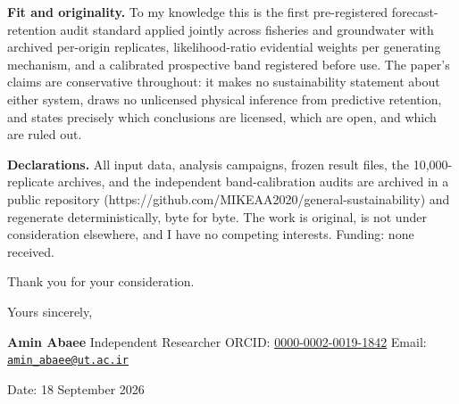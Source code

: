 \documentclass[11pt]{article}
\begin{document}
\textbf{Fit and originality.} To my knowledge this is the first
pre-registered forecast-retention audit standard applied jointly across
fisheries and groundwater with archived per-origin replicates,
likelihood-ratio evidential weights per generating mechanism, and a
calibrated prospective band registered before use. The paper's claims
are conservative throughout: it makes no sustainability statement about
either system, draws no unlicensed physical inference from predictive
retention, and states precisely which conclusions are licensed, which
are open, and which are ruled out.

\textbf{Declarations.} All input data, analysis campaigns, frozen result
files, the 10,000-replicate archives, and the independent
band-calibration audits are archived in a public repository
(https://github.com/MIKEAA2020/general-sustainability) and regenerate
deterministically, byte for byte. The work is original, is not under
consideration elsewhere, and I have no competing interests. Funding:
none received.

Thank you for your consideration.

Yours sincerely,

\textbf{Amin Abaee} Independent Researcher ORCID:
\href{https://orcid.org/0000-0002-0019-1842}{0000-0002-0019-1842} Email:
\href{mailto:amin_abaee@ut.ac.ir}{\nolinkurl{amin\_abaee@ut.ac.ir}}

Date: 18 September 2026
\end{document}

